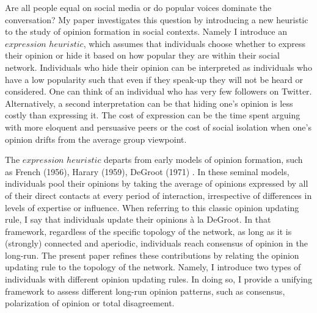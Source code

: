 \documentclass{article}
\begin{document}
Are all people equal on social media or do popular voices dominate the conversation? My paper investigates this question by introducing a new heuristic to the study of opinion formation in social contexts. Namely I introduce an $expression$ $heuristic$, which assumes that individuals choose whether to express their opinion or hide it based on how popular they are within their social network. Individuals who hide their opinion can be interpreted as individuals who have a low popularity such that even if they speak-up they will not be heard or considered. One can think of an individual who has very few followers on Twitter. Alternatively, a second interpretation can be that hiding one's opinion is less costly than expressing it. The cost of expression can be the time spent arguing with more eloquent and persuasive peers or the cost of social isolation when one's opinion drifts from the average group viewpoint.
 
\bigskip

The $expression$ $heuristic$ departs from early models of opinion formation, such as French (1956)\cite{french}, Harary (1959)\cite{harary}, DeGroot (1971) \cite{degroot}. In these seminal models, individuals pool their opinions by taking the average of opinions expressed by all of their direct contacts at every period of interaction, irrespective of differences in levels of expertise or influence. When referring to this classic opinion updating rule, I say that individuals update their opinions \`{a} la DeGroot. In that framework, regardless of the specific topology of the network, as long as it is (strongly) connected and aperiodic, individuals reach consensus of opinion in the long-run. The present paper refines these contributions by relating the opinion updating rule to the topology of the network. Namely, I introduce two types of individuals with different opinion updating rules. In doing so, I provide a unifying framework to assess different long-run opinion patterns, such as consensus, polarization of opinion or total disagreement.

\bigskip
\end{document}
